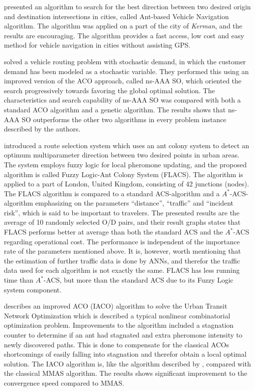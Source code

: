 \citet{salehi-nezhad07} presented an algorithm to search for the best direction between two desired origin and destination intersections in cities, called Ant-based Vehicle Navigation algorithm. The algorithm was applied on a part of the city of \textit{Kerman}, and the results are encouraging. The algorithm provides a fast access, low cost and easy method for vehicle navigation in cities without assisting GPS.

\citet{tripathi09} solved a vehicle routing problem with stochastic demand, in which the customer demand has been modeled as a stochastic variable. They performed this using an improved version of the ACO approach, called ns-AAA SO, which oriented the search progressively towards favoring the global optimal solution. The characteristics and search capability of ns-AAA SO was compared with both a standard ACO algorithm and a genetic algorithm. The results shows that ns-AAA SO outperforms the other two algorithms in every problem instance described by the authors. 

\citet{salehinejad10} introduced a route selection system which uses an ant colony system to detect an optimum multiparameter direction between two desired points in urban areas. The system employs fuzzy logic for local pheromone updating, and the proposed algorithm is called Fuzzy Logic-Ant Colony System (FLACS). The algorithm is applied to a part of London, United Kingdom, consisting of 42 junctions (nodes). The FLACS algorithm is compared to a standard ACS-algorithm and a $A^*$-ACS-algorithm emphasizing on the parameters ``distance'', ``traffic'' and ``incident risk'', which is said to be important to travelers. The presented results are the average of 10 randomly selected O/D pairs, and their result graphs states that FLACS performs better at average than both the standard ACS and the $A^*$-ACS regarding operational cost. The performance is independent of the importance rate of the parameters mentioned above. It is, however, worth mentioning that the estimation of further traffic data is done by ANNs, and therefor the traffic data used for each algorithm is not exactly the same. FLACS has less running time than $A^*$-ACS, but more than the standard ACS due to its Fuzzy Logic system component. 

\citet{jiang10} describes an improved ACO (IACO) algorithm to solve the Urban Transit Network Optimization which is described a typical nonlinear combinatorial optimization problem. Improvements to the algorithm included a stagnation counter to determine if an ant had stagnated and extra pheromone intensity to newly discovered paths. This is done to compensate for the classical ACOs shortcomings of easily falling into stagnation and therefor obtain a local optimal solution. The IACO algorithm is, like the algorithm described by \citet{yang07}, compared with the classical MMAS algorithm. The results shows significant improvement to the convergence speed compared to MMAS.

